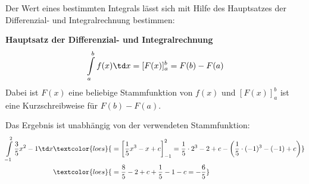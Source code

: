 Der Wert eines bestimmten Integrals lässt sich mit Hilfe des Hauptsatzes der Differenzial- und Integralrechnung bestimmen:
\begin{tcolorbox}
	\textbf{Hauptsatz der Differenzial- und Integralrechnung}
	\textcolor{loestc}{\[\int\limits_a^b f(x)\td x=[F(x)]_a^b=F(b)-F(a)\]}
	\textcolor{loestc}{Dabei ist \(F(x)\) eine beliebige Stammfunktion von \(f(x)\) und\newline
		\([F(x)]_a^b\) ist eine Kurzschreibweise für \(F(b)-F(a)\).}
\end{tcolorbox}
\begin{minipage}{\textwidth}
\end{minipage}

\bigskip

Das Ergebnis ist unabhängig von der verwendeten Stammfunktion:
\begin{align*}
	\int\limits_{-1}^2 \frac{3}{5}x^2-1\td x&\textcolor{loes}{\;=\left[\frac{1}{5}x^3-x+c\right]_{-1}^2=\frac{1}{5}\cdot 2^3-2+c-\left(\frac{1}{5}\cdot (-1)^3-(-1)+c\right)}\\
	&\textcolor{loes}{\;=\frac{8}{5}-2+c+\frac{1}{5}-1-c=-\frac{6}{5}}
\end{align*}

\vspace{-.5cm}

\begin{Exercise}[title={\raggedright\normalfont Berechne die Werte, der in Aufgabe \ref{integralGrafisch1} abgeschätzen Integrale, exakt.}, label=integralRechnA1]
\end{Exercise}

